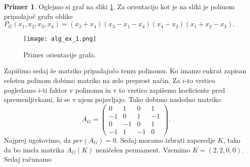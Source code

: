 \documentclass[12pt,a4paper,twoside]{article}
\theoremstyle{definition} %
\newtheorem{primer}[definicija]{Primer}
\theoremstyle{plain} %
\numberwithin{equation}{section}  %
\begin{document}
\begin{primer}

Oglejmo si graf na sliki \ref{ex_1}. Za orientacijo kot je na sliki je polinom pripadajoč grafu oblike $P_G(x_1, x_2, x_3, x_4) =(x_2 + x_4)(x_3 - x_1 - x_4)(x_4 - x_2)(x_1 + x_2 - x_3). $
 \begin{figure}[h!]
\caption{Primer orientacije grafa.}
\label{ex_1}
\centering
    \texttt{[image: alg\_ex\_1.png]}
    \end{figure}
Zapišimo sedaj še matriko pripadajočo temu polinomu. Ko imamo enkrat zapisan celoten polinom dobimo matriko na zelo preprost način. Za $i$-to vrstico pogledamo $i$-ti faktor v polinomu in v to vrstico zapišemo koeficiente pred spremenljivkami, ki se v njem pojavljajo. Tako dobimo nasledno matriko 
$$ A_G = \left( \begin{matrix} 0 & 1 & 0 & 1 \\ -1 & 0 & 1 & -1 \\ 0 & -1 & 0 & 1 \\ -1 & 1 & -1 & 0 \end{matrix} \right) .$$
 Najprej ugotovimo, da $per(A_G) = 0$. Sedaj moramo izbrati zaporedje $K$, tako da bo imela matrika $A_G(K)$ neničelen permament. Vzemimo $K = (2,2,0,0)$. Sedaj računamo 


\end{primer}
\end{document}
